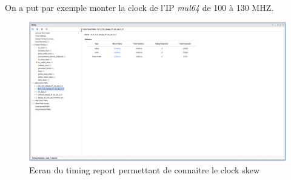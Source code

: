 \documentclass[12pt,a4paper]{ieee}
\begin{document}
On a put par exemple monter la clock de l'IP \textit{mul64} de 100 à 130 MHZ.

\begin{figure}[H]
	\centering
		\includegraphics[width=\linewidth]{im/timing.png}	
	\caption{Ecran du timing report permettant de connaitre le clock skew}
	\label{fig-clk}
\end{figure}
\end{document}
